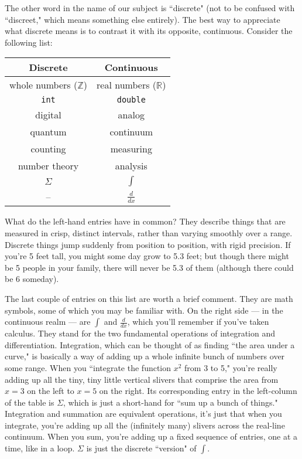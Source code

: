 The other word in the name of our subject is ``discrete" (not to be
confused with ``discreet," which means something else entirely). The best
way to appreciate what discrete means is to contrast it with its opposite,
continuous. Consider the following list:

\begin{center}
\begin{tabular}{c c}
Discrete & Continuous \\
\hline
whole numbers ($\mathbb{Z}$) & real numbers ($\mathbb{R}$) \\
\texttt{int} & \texttt{double} \\
digital & analog \\
quantum & continuum \\
counting & measuring \\
number theory & analysis \\
$\Sigma$ & $\int$ \\
-- & $\frac{d}{dx}$ \\
\end{tabular}
\end{center}

What do the left-hand entries have in common? They describe things that are
measured in crisp, distinct intervals, rather than varying smoothly over a
range. Discrete things jump suddenly from position to position, with rigid
precision.  If you're 5 feet tall, you might some day grow to 5.3 feet; but
though there might be 5 people in your family, there will never be 5.3
of them (although there could be 6 someday).

The last couple of entries on this list are worth a brief comment. They are
math symbols, some of which you may be familiar with. On the right side ---
in the continuous realm --- are $\int$ and $\frac{d}{dx}$, which you'll
remember if you've taken calculus. They stand for the two fundamental
operations of integration and differentiation. Integration, which can be
thought of as finding ``the area under a curve," is basically a way of
adding up a whole infinite bunch of numbers over some range. When you
``integrate the function $x^2$ from 3 to 5," you're really adding up all
the tiny, tiny little vertical slivers that comprise the area from $x=3$ on
the left to $x=5$ on the right. Its corresponding entry in the left-column
of the table is $\Sigma$, which is just a short-hand for ``sum up a bunch
of things." Integration and summation are equivalent operations, it's just
that when you integrate, you're adding up all the (infinitely many) slivers
across the real-line continuum. When you sum, you're adding up a fixed
sequence of entries, one at a time, like in a loop. $\Sigma$ is just the
discrete ``version" of $\int$. 

